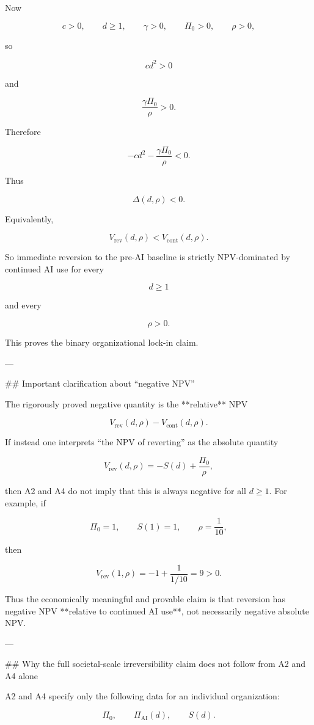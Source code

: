 Now

\[
c>0,\qquad d\ge 1,\qquad \gamma>0,\qquad \Pi_0>0,\qquad \rho>0,
\]

so

\[
cd^2>0
\]

and

\[
\frac{\gamma\Pi_0}{\rho}>0.
\]

Therefore

\[
-cd^2-\frac{\gamma\Pi_0}{\rho}<0.
\]

Thus

\[
\Delta(d,\rho)<0.
\]

Equivalently,

\[
V_{\mathrm{rev}}(d,\rho)<V_{\mathrm{cont}}(d,\rho).
\]

So immediate reversion to the pre-AI baseline is strictly NPV-dominated by continued AI use for every

\[
d\ge 1
\]

and every

\[
\rho>0.
\]

This proves the binary organizational lock-in claim.

---

## Important clarification about “negative NPV”

The rigorously proved negative quantity is the **relative** NPV

\[
V_{\mathrm{rev}}(d,\rho)-V_{\mathrm{cont}}(d,\rho).
\]

If instead one interprets “the NPV of reverting” as the absolute quantity

\[
V_{\mathrm{rev}}(d,\rho)
=
-S(d)+\frac{\Pi_0}{\rho},
\]

then A2 and A4 do not imply that this is always negative for all \(d\ge 1\). For example, if

\[
\Pi_0=1,\qquad S(1)=1,\qquad \rho=\frac{1}{10},
\]

then

\[
V_{\mathrm{rev}}(1,\rho)
=
-1+\frac{1}{1/10}
=
9>0.
\]

Thus the economically meaningful and provable claim is that reversion has negative NPV **relative to continued AI use**, not necessarily negative absolute NPV.

---

## Why the full societal-scale irreversibility claim does not follow from A2 and A4 alone

A2 and A4 specify only the following data for an individual organization:

\[
\Pi_0,\qquad \Pi_{\mathrm{AI}}(d),\qquad S(d).
\]

